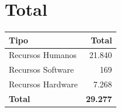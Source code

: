 \section{Total}

\begin{center}
	\begin{tabular}{| l | r |}
		\hline
		Tipo				&	Total			\\	\hline
		Recursos Humanos	& 	21.840			\\	\hline
		Recursos Software	&	169				\\	\hline
		Recursos Hardware	&	7.268			\\	\hline
		\textbf{Total}		&	\textbf{29.277}	\\
		\hline
	\end{tabular}
\end{center}